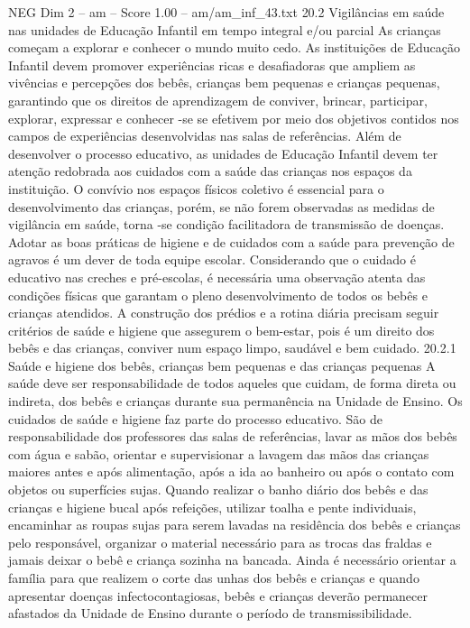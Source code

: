 \begin{textsample}{NEG Dim 2 – am – Score 1.00 – am/am\_inf\_43.txt}  \label{ex:f2_neg_140}
20.2 Vigilâncias em saúde nas unidades de Educação Infantil em tempo integral e/ou parcial As crianças começam a explorar e conhecer o mundo muito cedo.
As instituições de Educação Infantil devem promover experiências ricas e desafiadoras que ampliem as vivências e percepções dos bebês, crianças bem pequenas e crianças pequenas, garantindo que os direitos de aprendizagem de conviver, brincar, participar, explorar, expressar e conhecer -se se efetivem por meio dos objetivos contidos nos campos de experiências desenvolvidas nas salas de referências.
Além de desenvolver o processo educativo, as unidades de Educação Infantil devem ter atenção redobrada aos cuidados com a saúde das crianças nos espaços da instituição.
O convívio nos espaços físicos coletivo é essencial para o desenvolvimento das crianças, porém, se não forem observadas as medidas de vigilância em saúde, torna -se condição facilitadora de transmissão de doenças.
Adotar as boas práticas de higiene e de cuidados com a saúde para prevenção de agravos é um dever de toda equipe escolar.
Considerando que o cuidado é educativo nas creches e pré-escolas, é necessária uma observação atenta das condições físicas que garantam o pleno desenvolvimento de todos os bebês e crianças atendidos.
A construção dos prédios e a rotina diária precisam seguir critérios de saúde e higiene que assegurem o bem-estar, pois é um direito dos bebês e das crianças, conviver num espaço limpo, saudável e bem cuidado. 20.2.1 Saúde e higiene dos bebês, crianças bem pequenas e das crianças pequenas A saúde deve ser responsabilidade de todos aqueles que cuidam, de forma direta ou indireta, dos bebês e crianças durante sua permanência na Unidade de Ensino.
Os cuidados de saúde e higiene faz parte do processo educativo.
São de responsabilidade dos professores das salas de referências, lavar as mãos dos bebês com água e sabão, orientar e supervisionar a lavagem das mãos das crianças maiores antes e após alimentação, após a ida ao banheiro ou após o contato com objetos ou superfícies sujas.
Quando realizar o banho diário dos bebês e das crianças e higiene bucal após refeições, utilizar toalha e pente individuais, encaminhar as roupas sujas para serem lavadas na residência dos bebês e crianças pelo responsável, organizar o material necessário para as trocas das fraldas e jamais deixar o bebê e criança sozinha na bancada.
Ainda é necessário orientar a família para que realizem o corte das unhas dos bebês e crianças e quando apresentar doenças infectocontagiosas, bebês e crianças deverão permanecer afastados da Unidade de Ensino durante o período de transmissibilidade.

\end{textsample}
